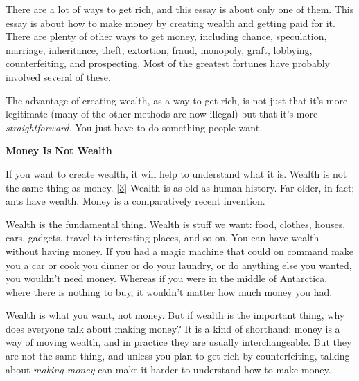 There
                    are a lot of ways to get rich, and this essay is about only
                    one of them. This essay is about how to make money by
                    creating wealth and getting paid for it. There are plenty of
                    other ways to get money, including chance, speculation,
                    marriage, inheritance, theft, extortion, fraud, monopoly,
                    graft, lobbying, counterfeiting, and prospecting. Most of
                    the greatest fortunes have probably involved several of
                    these.

The advantage of creating wealth, as a way
                    to get rich, is not just that it's more legitimate (many of
                    the other methods are now illegal) but that it's more
                    \emph{straightforward.} You just have to do something people
                    want.

\textbf{Money Is Not Wealth}

If
                    you want to create wealth, it will help to understand what
                    it is. Wealth is not the same thing as money.
                    [\href{\#f3n}{3}]
                    Wealth is as old as human history. Far older, in fact; ants
                    have wealth. Money is a comparatively recent invention.

Wealth
                    is the fundamental thing. Wealth is stuff we want: food,
                    clothes, houses, cars, gadgets, travel to interesting
                    places, and so on. You can have wealth without having money.
                    If you had a magic machine that could on command make you a
                    car or cook you dinner or do your laundry, or do anything
                    else you wanted, you wouldn't need money. Whereas if you
                    were in the middle of Antarctica, where there is nothing to
                    buy, it wouldn't matter how much money you had.

Wealth
                    is what you want, not money. But if wealth is the important
                    thing, why does everyone talk about making money? It is a
                    kind of shorthand: money is a way of moving wealth, and in
                    practice they are usually interchangeable. But they are not
                    the same thing, and unless you plan to get rich by
                    counterfeiting, talking about \emph{making money} can make
                    it harder to understand how to make money.


